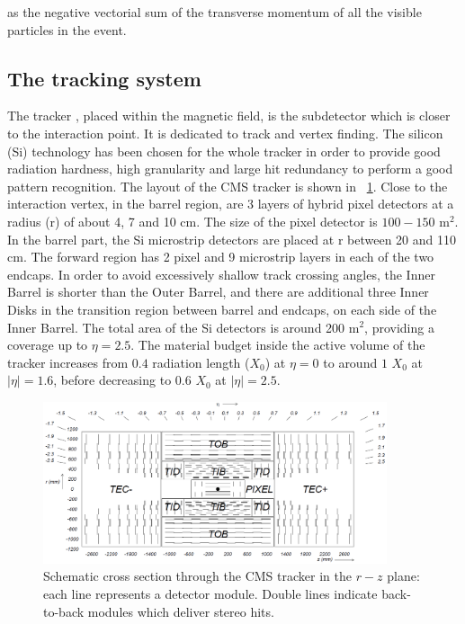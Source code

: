as the negative vectorial sum of the transverse momentum of all the visible particles in the event.




\subsection{The tracking system}
\label{sec:tracker}
The tracker \cite{Tracker_1, Tracker_2}, placed within the magnetic field, is the subdetector which is closer to the interaction point. It is dedicated to track and vertex finding. The silicon (Si) technology has been chosen for the whole tracker in order to provide good radiation hardness, high granularity and large hit redundancy to perform a good pattern recognition. The layout of the CMS tracker is shown in \figurename~\ref{tracking_system}. Close to the interaction vertex, in the barrel region, are 3 layers of hybrid pixel detectors at a radius (r) of about 4, 7 and 10 cm. The size of the pixel detector is $100-150$ m$^2$. In the barrel part, the Si microstrip detectors are placed at r between 20 and 110 cm. The forward region has 2 pixel and 9 microstrip layers in each of the two endcaps. In order to avoid excessively shallow track crossing angles, the Inner Barrel is shorter than the Outer Barrel, and there are additional three Inner Disks in the transition region between barrel and endcaps, on each side of the Inner Barrel. The total area of the Si detectors is around 200 m$^2$, providing a coverage up to $\eta = 2.5$. The material budget inside the active volume of the tracker increases from $0.4$ radiation length ($X_0$) at $\eta= 0$ to around $1$  $X_0$ at $|\eta|= 1.6$, before decreasing to $0.6$ $X_0$ at $|\eta|= 2.5$. \\
\begin{figure}[h!]
 \centering
 \includegraphics[width=0.9\textwidth]{Images/cmsTracker_TrackerLayout}
\caption{Schematic cross section through the CMS tracker in the $r-z$ plane: each line represents a detector module. Double lines indicate back-to-back modules which deliver stereo hits.}
\label{tracking_system}
\end{figure}


